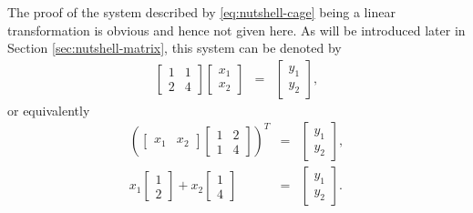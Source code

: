 The proof of the system described by \eqref{eq:nutshell-cage} being a linear transformation is obvious and hence not given here. As will be introduced later in Section \ref{sec:nutshell-matrix}, this system can be denoted by
\begin{eqnarray}
  \left[\begin{array}{cc}
          1 & 1 \\
          2 & 4 
        \end{array}\right]\left[\begin{array}{c}
                                  x_1 \\
                                  x_2 
                                \end{array}\right] &=& \left[\begin{array}{c}
                                                               y_1 \\
                                                               y_2 
                                                             \end{array}\right], \nonumber
\end{eqnarray}
or equivalently
\begin{eqnarray}
  \left(\left[\begin{array}{cc}
  	x_1 & x_2
  \end{array}\right]\left[\begin{array}{cc}
  1 & 2 \\
  1 & 4
  \end{array}\right]\right)^T &=& \left[\begin{array}{c}
  y_1 \\
  y_2
  \end{array}\right], \nonumber \\
  x_1 \left[\begin{array}{c}
              1 \\
              2 
            \end{array}\right] + x_2 \left[\begin{array}{c}
                                             1 \\
                                             4 
                                           \end{array}\right] &=& \left[\begin{array}{c}
                                                                          y_1 \\
                                                                          y_2 
                                                                        \end{array}\right]. \nonumber
\end{eqnarray}


